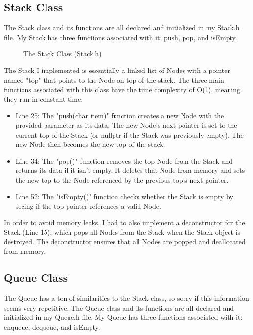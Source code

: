 \documentclass[letterpaper, 10pt]{article}
\begin{document}
\subsection{Stack Class}
\noindent
The Stack class and its functions are all declared and initialized in my Stack.h file. My Stack has three functions associated with it: push, pop, and isEmpty. 
\begin{figure}[H]
  \centering
   
  \label{fig:figure2.2_part1}
\end{figure}

\begin{figure}[H]
  \centering
   
  \caption{The Stack Class (Stack.h)}
  \label{fig:figure2.2_part2}
\end{figure}
\noindent
The Stack I implemented is essentially a linked list of Nodes with a pointer named "top" that points to the Node on top of the stack. The three main functions associated with this class have the time complexity of O(1), meaning they run in constant time. 
\noindent
\begin{itemize}
  \item Line 25: The "push(char item)" function creates a new Node with the provided parameter as its data. The new Node's next pointer is set to the current top of the Stack (or nullptr if the Stack was previously empty). The new Node then becomes the new top of the stack.
  \item Line 34: The "pop()" function removes the top Node from the Stack and returns its data if it isn't empty. It deletes that Node from memory and sets the new top to the Node referenced by the previous top's next pointer.
  \item Line 52: The "isEmpty()" function checks whether the Stack is empty by seeing if the top pointer references a valid Node.
\end{itemize} 
\noindent
In order to avoid memory leaks, I had to also implement a deconstructor for the Stack (Line 15), which pops all Nodes from the Stack when the Stack object is destroyed. The deconstructor ensures that all Nodes are popped and deallocated from memory.  

\subsection{Queue Class}
The Queue has a ton of similarities to the Stack class, so sorry if this information seems very repetitive. The Queue class and its functions are all declared and initialized in my Queue.h file. My Queue has three functions associated with it: enqueue, dequeue, and isEmpty. 
\begin{figure}[H]
  \centering
   
  \label{fig:figure2.3_part1}
\end{figure}
\end{document}
